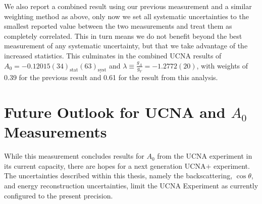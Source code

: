 We also report a combined result using our previous measurement \cite{mendenhall2013} and a
similar weighting method as above, only now we set all systematic uncertainties
to the smallest reported value between the two measurements and treat them as completely correlated.
This in turn means we do not benefit beyond the best measurement of any systematic uncertainty, but
that we take advantage of the increased statistics. This culminates in the combined UCNA results of
$A_0=-0.12015(34)_{\mathrm{stat}}(63)_{\mathrm{syst}}$ 
and $\lambda\equiv \frac{g_{A}}{g_{V}}=-1.2772(20)$, with weights of 0.39 for the previous
result \cite{mendenhall2013} and 0.61 for the result from this analysis.


\section{Future Outlook for UCNA and $A_0$ Measurements}

While this measurement concludes results for $A_0$ from the UCNA experiment in its current
capacity, there are hopes for a next generation UCNA$+$ experiment. The uncertainties described
within this thesis, namely the backscattering, $\cos\theta$, and energy reconstruction
uncertainties,  limit the UCNA Experiment as currently configured to the present precision.

